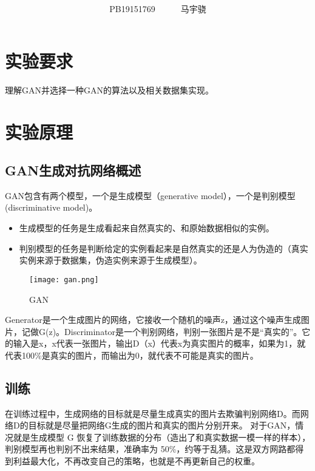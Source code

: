 \documentclass[a4paper,AutoFakeBold,AutoFakeSlant]{ctexart}
\title{\textbf{\textsf{\heiti{深度学习Lab5实验报告}}}}
\author{\ssong PB19151769~~~~~~马宇骁}
\date{}
\makeatletter
\renewcommand{\abstractname}{}    %
\renewenvironment{abstract}{%
      \if@twocolumn
        \section*{\abstractname}%
      \else
        \small
        \begin{center}%
          {\bfseries \abstractname\vspace{-.5em}\vspace{\z@}}%
        \end{center}%
      \fi}
      {}
\makeatother
\begin{document}
\maketitle



\section{实验要求}
理解GAN并选择一种GAN的算法以及相关数据集实现。


\section{实验原理}

\subsection{GAN生成对抗网络概述}
GAN包含有两个模型，一个是生成模型（generative model），一个是判别模型(discriminative model)。
\begin{itemize}
  \item 生成模型的任务是生成看起来自然真实的、和原始数据相似的实例。
  \item 判别模型的任务是判断给定的实例看起来是自然真实的还是人为伪造的（真实实例来源于数据集，伪造实例来源于生成模型）。
\end{itemize}
\begin{figure}[htbp]
  \centering
  \texttt{[image: gan.png]}
  \caption{GAN}
\end{figure}

Generator是一个生成图片的网络，它接收一个随机的噪声z，通过这个噪声生成图片，记做G(z)。Discriminator是一个判别网络，判别一张图片是不是“真实的”。它的输入是x，x代表一张图片，输出D（x）代表x为真实图片的概率，如果为1，就代表100\%是真实的图片，而输出为0，就代表不可能是真实的图片。

\subsection{训练}
在训练过程中，生成网络的目标就是尽量生成真实的图片去欺骗判别网络D。而网络D的目标就是尽量把网络G生成的图片和真实的图片分别开来。
对于GAN，情况就是生成模型 G 恢复了训练数据的分布（造出了和真实数据一模一样的样本），判别模型再也判别不出来结果，准确率为 50\%，约等于乱猜。这是双方网路都得到利益最大化，不再改变自己的策略，也就是不再更新自己的权重。
\end{document}
